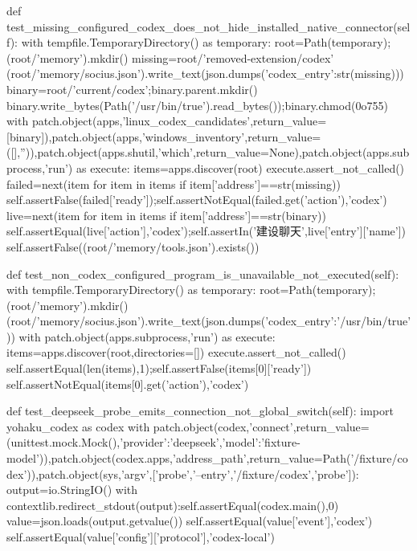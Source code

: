     def test_missing_configured_codex_does_not_hide_installed_native_connector(self):
        with tempfile.TemporaryDirectory() as temporary:
            root=Path(temporary);(root/'memory').mkdir()
            missing=root/'removed-extension/codex'
            (root/'memory/socius.json').write_text(json.dumps({'codex_entry':str(missing)}))
            binary=root/'current/codex';binary.parent.mkdir()
            binary.write_bytes(Path('/usr/bin/true').read_bytes());binary.chmod(0o755)
            with patch.object(apps,'linux_codex_candidates',return_value=[binary]),patch.object(apps,'windows_inventory',return_value=([],'')),patch.object(apps.shutil,'which',return_value=None),patch.object(apps.subprocess,'run') as execute:
                items=apps.discover(root)
                execute.assert_not_called()
            failed=next(item for item in items if item['address']==str(missing))
            self.assertFalse(failed['ready']);self.assertNotEqual(failed.get('action'),'codex')
            live=next(item for item in items if item['address']==str(binary))
            self.assertEqual(live['action'],'codex');self.assertIn('建设聊天',live['entry']['name'])
            self.assertFalse((root/'memory/tools.json').exists())

    def test_non_codex_configured_program_is_unavailable_not_executed(self):
        with tempfile.TemporaryDirectory() as temporary:
            root=Path(temporary);(root/'memory').mkdir()
            (root/'memory/socius.json').write_text(json.dumps({'codex_entry':'/usr/bin/true'}))
            with patch.object(apps.subprocess,'run') as execute:
                items=apps.discover(root,directories=[])
                execute.assert_not_called()
            self.assertEqual(len(items),1);self.assertFalse(items[0]['ready'])
            self.assertNotEqual(items[0].get('action'),'codex')

    def test_deepseek_probe_emits_connection_not_global_switch(self):
        import yohaku_codex as codex
        with patch.object(codex,'connect',return_value=(unittest.mock.Mock(),{'provider':'deepseek','model':'fixture-model'})),patch.object(codex.apps,'address_path',return_value=Path('/fixture/codex')),patch.object(sys,'argv',['probe','--entry','/fixture/codex','probe']):
            output=io.StringIO()
            with contextlib.redirect_stdout(output):self.assertEqual(codex.main(),0)
            value=json.loads(output.getvalue())
            self.assertEqual(value['event'],'codex')
            self.assertEqual(value['config']['protocol'],'codex-local')

